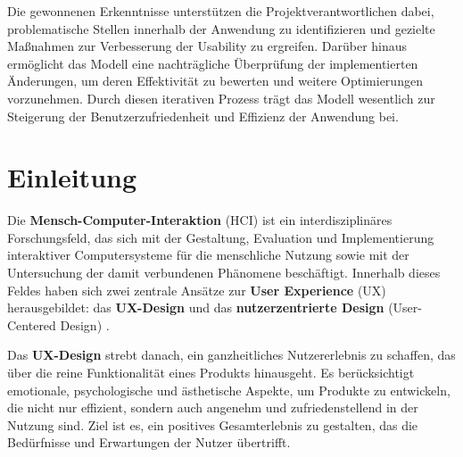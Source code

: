 \documentclass[12pt,oneside]{article}
\begin{document}
Die gewonnenen Erkenntnisse unterstützen die Projektverantwortlichen dabei, problematische Stellen innerhalb der Anwendung zu identifizieren und gezielte Maßnahmen zur Verbesserung der Usability zu ergreifen. Darüber hinaus ermöglicht das Modell eine nachträgliche Überprüfung der implementierten Änderungen, um deren Effektivität zu bewerten und weitere Optimierungen vorzunehmen. Durch diesen iterativen Prozess trägt das Modell wesentlich zur Steigerung der Benutzerzufriedenheit und Effizienz der Anwendung bei.

\tableofcontents
 
 
\begin{acronym}[hyperlinks]
\end{acronym}

\section{Einleitung}

Die \textbf{Mensch-Computer-Interaktion} (HCI) ist ein interdisziplinäres Forschungsfeld, das sich mit der Gestaltung, Evaluation und Implementierung interaktiver Computersysteme für die menschliche Nutzung sowie mit der Untersuchung der damit verbundenen Phänomene beschäftigt. Innerhalb dieses Feldes haben sich zwei zentrale Ansätze zur \textbf{User Experience} (UX) herausgebildet: das \textbf{UX-Design} und das \textbf{nutzerzentrierte Design} (User-Centered Design) \cite{glanznig}.

Das \textbf{UX-Design} strebt danach, ein ganzheitliches Nutzererlebnis zu schaffen, das über die reine Funktionalität eines Produkts hinausgeht. Es berücksichtigt emotionale, psychologische und ästhetische Aspekte, um Produkte zu entwickeln, die nicht nur effizient, sondern auch angenehm und zufriedenstellend in der Nutzung sind. Ziel ist es, ein positives Gesamterlebnis zu gestalten, das die Bedürfnisse und Erwartungen der Nutzer übertrifft.
\end{document}
